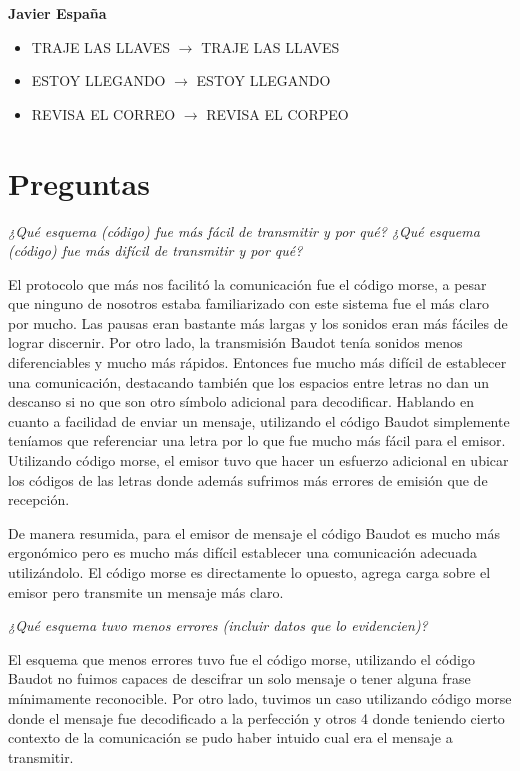 \documentclass[11pt]{article}
\begin{document}
\textbf{Javier España}
\begin{itemize}[nosep]
  \item TRAJE LAS LLAVES $\rightarrow$ TRAJE LAS LLAVES
  \item ESTOY LLEGANDO $\rightarrow$ ESTOY LLEGANDO
  \item REVISA EL CORREO $\rightarrow$ REVISA EL CORPEO
\end{itemize}

\section*{Preguntas}
\textit{¿Qué esquema (código) fue más fácil de transmitir y por qué? ¿Qué esquema (código) fue más difícil
de transmitir y por qué?}

El protocolo que más nos facilitó la comunicación fue el código morse, a pesar que ninguno de nosotros estaba familiarizado con este
sistema fue el más claro por mucho. Las pausas eran bastante más largas y los sonidos eran más fáciles de lograr discernir. Por otro lado,
la transmisión Baudot tenía sonidos menos diferenciables y mucho más rápidos. Entonces fue mucho más difícil de establecer una comunicación, destacando
también que los espacios entre letras no dan un descanso si no que son otro símbolo adicional para decodificar. Hablando en cuanto
a facilidad de enviar un mensaje, utilizando el código Baudot simplemente teníamos que referenciar una letra por lo que fue mucho
más fácil para el emisor. Utilizando código morse, el emisor tuvo que hacer un esfuerzo adicional en ubicar los códigos de las letras
donde además sufrimos más errores de emisión que de recepción.

De manera resumida, para el emisor de mensaje el código Baudot es mucho más ergonómico pero es mucho más difícil establecer una
comunicación adecuada utilizándolo. El código morse es directamente lo opuesto, agrega carga sobre el emisor pero transmite un mensaje
más claro.

\textit{¿Qué esquema tuvo menos errores (incluir datos que lo evidencien)?}

El esquema que menos errores tuvo fue el código morse, utilizando el código Baudot no fuimos capaces de descifrar un solo mensaje o
tener alguna frase mínimamente reconocible. Por otro lado, tuvimos un caso utilizando código morse donde el mensaje fue decodificado
a la perfección y otros 4 donde teniendo cierto contexto de la comunicación se pudo haber intuido cual era el mensaje a transmitir.
\end{document}
